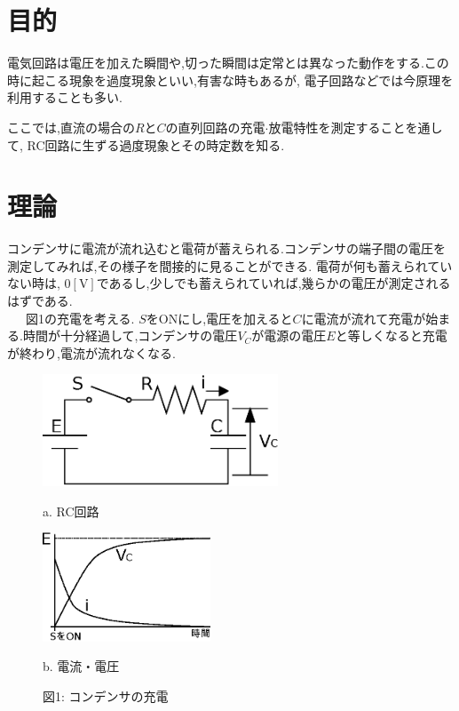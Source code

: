 \documentclass[uplatex]{jsarticle}
\begin{document}
	\section{目的}
		電気回路は電圧を加えた瞬間や,切った瞬間は定常とは異なった動作をする.この時に起こる現象を過度現象といい,有害な時もあるが,
		電子回路などでは今原理を利用することも多い.\par
		ここでは,直流の場合の$R$と$C$の直列回路の充電$\cdot$放電特性を測定することを通して, RC回路に生ずる過度現象とその時定数を知る.
	\section{理論}
		コンデンサに電流が流れ込むと電荷が蓄えられる.コンデンサの端子間の電圧を測定してみれば,その様子を間接的に見ることができる.
		電荷が何も蓄えられていない時は, $0 [\mathrm V]$であるし,少しでも蓄えられていれば,幾らかの電圧が測定されるはずである.\\[1ex]
		\ \ \ 図1の充電を考える. $S$をONにし,電圧を加えると$C$に電流が流れて充電が始まる.時間が十分経過して,コンデンサの電圧$V_{C}$が電源の電圧$E$と等しくなると充電
		が終わり,電流が流れなくなる.
		\begin{figure}[H]
			\begin{minipage}{0.5\hsize}
				\begin{center}
					\includegraphics[width = 7cm]{1-a.eps}
				\end{center}
				\captionsetup{labelformat=empty,labelsep=none}
				\caption{a. RC回路}
			\end{minipage}
			\begin{minipage}{0.5\hsize}
				\begin{center}
					\includegraphics[width = 5cm]{1-b.eps}
				\end{center}
				\captionsetup{labelformat=empty,labelsep=none}
				\caption{b. 電流・電圧}
			\end{minipage}
			\captionsetup{labelformat=empty,labelsep=none}
			\caption{図1: コンデンサの充電}
		\end{figure}
\end{document}
